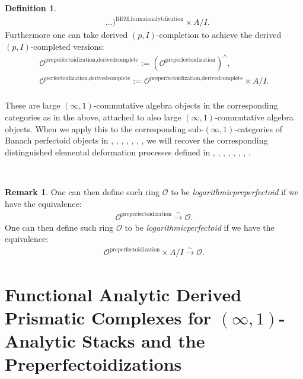 \documentclass[11pt]{book}
\theoremstyle{definition}
\newtheorem{definition}[theorem]{Definition}
\newtheorem{remark}[theorem]{Remark}
\numberwithin{equation}{section}
\begin{document}
\begin{definition}
\begin{align}
&...)^{\text{BBM,formalanalytification}}\times A/I.	
\end{align}
Furthermore one can take derived $(p,I)$-completion to achieve the derived $(p,I)$-completed versions:
\begin{align}
\mathcal{O}^\text{preperfectoidization,derivedcomplete}:=(\mathcal{O}^\text{preperfectoidization})^{\wedge},\\
\mathcal{O}^\text{perfectoidization,derivedcomplete}:=\mathcal{O}^\text{preperfectoidization,derivedcomplete}\times A/I.\\
\end{align}

\noindent These are large $(\infty,1)$-commutative algebra objects in the corresponding categories as in the above, attached to also large $(\infty,1)$-commutative algebra objects. When we apply this to the corresponding sub-$(\infty,1)$-categories of Banach perfectoid objects in \cite{BMS2}, \cite{12DLLZ1}, \cite{12DLLZ2}, \cite{GR}, \cite{12KL1}, \cite{12KL2}, \cite{12Ked1}, \cite{12Sch3} we will recover the corresponding distinguished elemental deformation processes defined in \cite{BMS2}, \cite{12DLLZ1}, \cite{12DLLZ2}, \cite{GR}, \cite{12KL1}, \cite{12KL2}, \cite{12Ked1}, \cite{12Sch3}.
\end{definition}



\

\begin{remark}
One can then define such ring $\mathcal{O}$ to be \textit{logarithmicpreperfectoid} if we have the equivalence:
\begin{align}
\mathcal{O}^{\text{preperfectoidization}} \overset{\sim}{\longrightarrow}	\mathcal{O}.
\end{align}
One can then define such ring $\mathcal{O}$ to be \textit{logarithmicperfectoid} if we have the equivalence:
\begin{align}
\mathcal{O}^{\text{preperfectoidization}}\times A/I \overset{\sim}{\longrightarrow}	\mathcal{O}.
\end{align}
	
\end{remark}




\newpage

\section{Functional Analytic Derived Prismatic Complexes for $(\infty,1)$-Analytic Stacks and the Preperfectoidizations}
\end{document}
